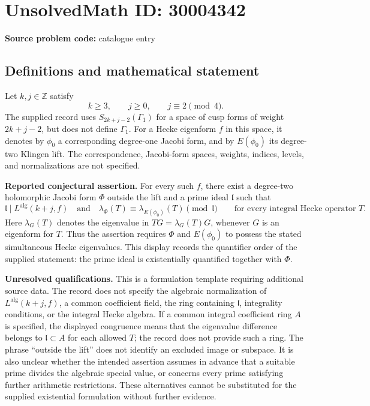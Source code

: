 \documentclass[11pt]{article}
\newcommand{\Z}{\mathbb{Z}}
\begin{document}
\section*{UnsolvedMath ID: 30004342}
\textbf{Source problem code:} catalogue entry
\subsection{Definitions and mathematical statement}
Let \(k,j\in\Z\) satisfy
\[
 k\geq 3,\qquad j\geq 0,\qquad j\equiv 2\pmod 4.
\]
The supplied record uses \(S_{2k+j-2}(\Gamma_1)\) for a space of cusp forms of weight \(2k+j-2\), but does not define \(\Gamma_1\). For a Hecke eigenform \(f\) in this space, it denotes by \(\phi_0\) a corresponding degree-one Jacobi form, and by \(E(\phi_0)\) its degree-two Klingen lift. The correspondence, Jacobi-form spaces, weights, indices, levels, and normalizations are not specified.

\textbf{Reported conjectural assertion.} For every such \(f\), there exist a degree-two holomorphic Jacobi form \(\Phi\) outside the lift and a prime ideal \(\mathfrak l\) such that
\[
 \mathfrak l\mid L^{\mathrm{alg}}(k+j,f)
 \quad\text{and}\quad
 \lambda_{\Phi}(T)\equiv
 \lambda_{E(\phi_0)}(T)\pmod{\mathfrak l}
 \qquad\text{for every integral Hecke operator }T.
\]
Here \(\lambda_G(T)\) denotes the eigenvalue in \(TG=\lambda_G(T)G\), whenever \(G\) is an eigenform for \(T\). Thus the assertion requires \(\Phi\) and \(E(\phi_0)\) to possess the stated simultaneous Hecke eigenvalues. This display records the quantifier order of the supplied statement: the prime ideal is existentially quantified together with \(\Phi\).

\textbf{Unresolved qualifications.} This is a formulation template requiring additional source data. The record does not specify the algebraic normalization of \(L^{\mathrm{alg}}(k+j,f)\), a common coefficient field, the ring containing \(\mathfrak l\), integrality conditions, or the integral Hecke algebra. If a common integral coefficient ring \(A\) is specified, the displayed congruence means that the eigenvalue difference belongs to \(\mathfrak l\subset A\) for each allowed \(T\); the record does not provide such a ring. The phrase ``outside the lift'' does not identify an excluded image or subspace. It is also unclear whether the intended assertion assumes in advance that a suitable prime divides the algebraic special value, or concerns every prime satisfying further arithmetic restrictions. These alternatives cannot be substituted for the supplied existential formulation without further evidence.
\end{document}
